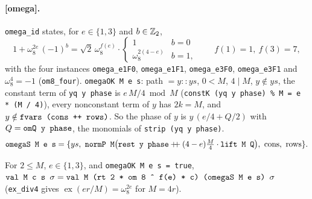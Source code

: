 \paragraph{[omega].} \textnormal{\texttt{omega\_\allowbreak{}id}} states, for $e\in\{1,3\}$ and $b\in\mathbb{Z}_{2}$,
\[
1+\omega_8^{2e}\,(-1)^{b} = \sqrt2\,\omega_8^{f(e)}\cdot\begin{cases}1 & b=0\\ \omega_8^{2(4-e)} & b=1,\end{cases}
\qquad f(1)=1,\ f(3)=7,
\]
with the four instances \textnormal{\texttt{omega\_\allowbreak{}e1F0}}, \textnormal{\texttt{omega\_\allowbreak{}e1F1}}, \textnormal{\texttt{omega\_\allowbreak{}e3F0}},
\textnormal{\texttt{omega\_\allowbreak{}e3F1}} and $\omega_8^4=-1$ (\textnormal{\texttt{om8\_\allowbreak{}four}}). \textnormal{\texttt{omegaOK M e s}}: path $=y::ys$,
$0<M$, $4\mid M$, $y\notin ys$, the constant term of \textnormal{\texttt{yq y phase}} is $e\,M/4 \bmod M$
(\textnormal{\texttt{constK (\allowbreak{}yq y phase) \% M = e * (\allowbreak{}M / 4)}}), every nonconstant term of $y$ has $2k=M$, and
$y\notin\textnormal{\texttt{fvars (\allowbreak{}cons ++ rows)}}$. So the phase of $y$ is $y\,(e/4+Q/2)$ with
$Q=\textnormal{\texttt{omQ y phase}}$, the monomials of \textnormal{\texttt{strip (\allowbreak{}yq y phase)}}.
\[
\textnormal{\texttt{omegaS M e s}} = \{ys,\ \textnormal{\texttt{normP M}}\bigl(\textnormal{\texttt{rest y phase}} \mathbin{+\!\!+} (4-e)\tfrac{M}{4}\cdot\textnormal{\texttt{lift M Q}}\bigr),\ \text{cons},\ \text{rows}\}.
\]
\begin{theorem}
For $2\le M$, $e\in\{1,3\}$, and \textnormal{\texttt{omegaOK M e s = true}},
$\textnormal{\texttt{val M c s \ensuremath{\sigma}}} = \textnormal{\texttt{val M (\allowbreak{}rt 2 * om 8 \^{} f(\allowbreak{}e) * c) (\allowbreak{}omegaS M e s) \ensuremath{\sigma}}}$ (\textnormal{\texttt{ex\_\allowbreak{}div4}}
gives $\operatorname{ex}(er/M) = \omega_8^{2e}$ for $M=4r$).
\end{theorem}

